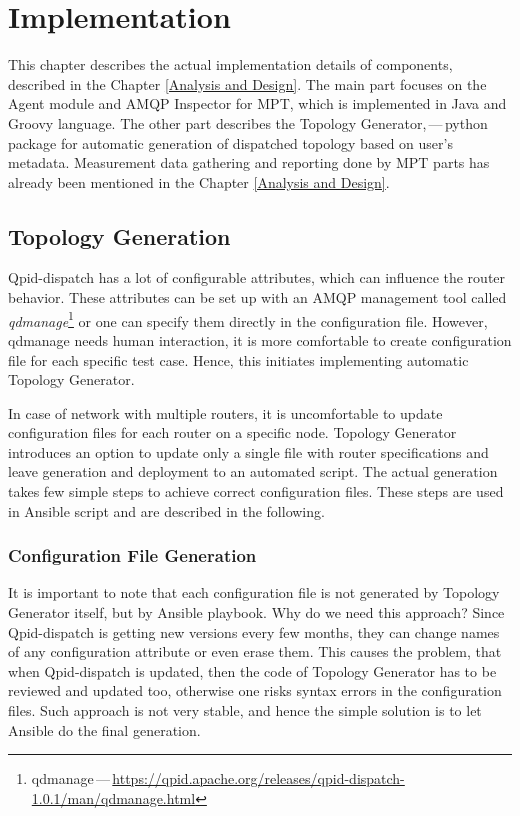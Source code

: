 \chapter{Implementation}
\label{Implementation}
This chapter describes the actual implementation details of components, described in the Chapter \ref{Analysis and Design}. The main part focuses on the Agent module and AMQP Inspector for MPT, which is implemented in Java and Groovy language. The other part describes the Topology Generator,\,---\,python package for automatic generation of dispatched topology based on user's metadata. Measurement data gathering and reporting done by MPT parts has already been mentioned in the Chapter \ref{Analysis and Design}.

\section{Topology Generation}
Qpid-dispatch has a lot of configurable attributes, which can influence the router behavior. These attributes can be set up with an AMQP management tool called \emph{qdmanage}\footnote{qdmanage\,---\,\url{https://qpid.apache.org/releases/qpid-dispatch-1.0.1/man/qdmanage.html}} or one can specify them directly in the configuration file. However, qdmanage needs human interaction, it is more comfortable to create configuration file for each specific test case. Hence, this initiates implementing automatic Topology Generator.

In case of network with multiple routers, it is uncomfortable to update configuration files for each router on a specific node. Topology Generator introduces an option to update only a single file with router specifications and leave generation and deployment to an automated script. The actual generation takes few simple steps to achieve correct configuration files. These steps are used in Ansible script and are described in the following.

\subsection{Configuration File Generation}
It is important to note that each configuration file is not generated by Topology Generator itself, but by Ansible playbook. Why do we need this approach? Since Qpid-dispatch is getting new versions every few months, they can change names of any configuration attribute or even erase them. This causes the problem, that when Qpid-dispatch is updated, then the code of Topology Generator has to be reviewed and updated too, otherwise one risks syntax errors in the configuration files. Such approach is not very stable, and hence the simple solution is to let Ansible do the final generation.

